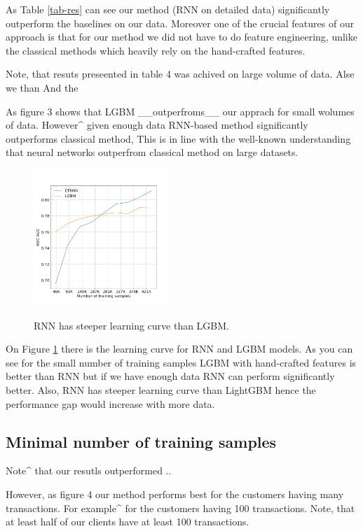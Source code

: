 \documentclass{sigkddExp}
\begin{document}
As Table \ref{tab-res} can see our method (RNN on detailed data) significantly outperform the baselines on our data. Moreover one of the crucial features of our approach is that for our method we did not have to do feature engineering, unlike the classical methods which heavily rely on the hand-crafted features.


Note, that resuts preseented in table 4 was achived on large volume of data. Alse we than And the 

As figure 3 shows that LGBM __outperfroms__ our apprach for small wolumes of data. However^ given enough data RNN-based method significantly outperforms classical method, This is in line with the well-known understanding that neural networks outperfrom classical method on large datasets.

\begin{figure}[h]
  \caption{RNN has steeper learning curve than LGBM.}
  \includegraphics[width=0.46\textwidth]{learning-curve.png}
  \label{fig-lc}
\end{figure}

On Figure \ref{fig-lc} there is the learning curve for RNN and LGBM models. As you can see for the small number of training samples LGBM with hand-crafted features is better than RNN but if we have enough data RNN can perform significantly better. Also, RNN has steeper learning curve than LightGBM hence the performance gap would increase with more data.

\subsection{Minimal number of training samples}

Note^ that our resutls outperformed ..

However, as figure 4 our method performs best for the customers having many transactions. For example^ for the customers having 100 transactions. Note, that at least half of our clients have at least 100 transactions.
\end{document}
